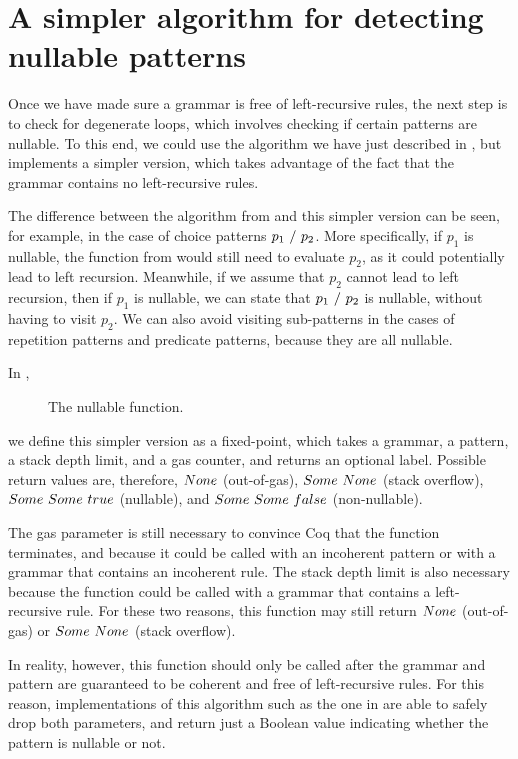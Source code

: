 \section{A simpler algorithm for detecting nullable patterns}
\label{section:nullable}

Once we have made sure a grammar is free of left-recursive rules,
the next step is to check for degenerate loops,
which involves checking if certain patterns are nullable.
To this end,
we could use the algorithm we have just described in ,
but \lpeg{} implements a simpler version,
which takes advantage of the fact that
the grammar contains no left-recursive rules.

The difference between the algorithm from 
and this simpler version can be seen,
for example, in the case of choice patterns $p_1\ /\ p_2$.
More specifically, if $p_1$ is nullable,
the function from 
would still need to evaluate $p_2$,
as it could potentially lead to left recursion.
Meanwhile, if we assume that $p_2$ cannot lead to left recursion,
then if $p_1$ is nullable,
we can state that $p_1\ /\ p_2$ is nullable,
without having to visit $p_2$.
We can also avoid visiting sub-patterns in the cases of
repetition patterns and predicate patterns,
because they are all nullable.

In ,
\begin{figure}[ht!]
    \centering
    
    \caption{The nullable function.}
    \label{fig:nullable-function}
\end{figure}
we define this simpler version as a fixed-point,
which takes a grammar,
a pattern, a stack depth limit, and a gas counter,
and returns an optional label.
Possible return values are, therefore,
$None$ (out-of-gas), $Some\ None$ (stack overflow),
$Some\ Some\ true$ (nullable), and $Some\ Some\ false$ (non-nullable).

The gas parameter is still necessary to convince Coq that
the function terminates,
and because it could be called
with an incoherent pattern or
with a grammar that contains an incoherent rule.
The stack depth limit is also necessary
because the function could be called
with a grammar that contains a left-recursive rule.
For these two reasons,
this function
may still return $None$ (out-of-gas)
or $Some\ None$ (stack overflow).

In reality, however,
this function should only be called after
the grammar and pattern are guaranteed to be
coherent and free of left-recursive rules.
For this reason,
implementations of this algorithm
such as the one in \lpeg{}
are able to safely drop both parameters,
and return just a Boolean value
indicating whether the pattern is nullable or not.

